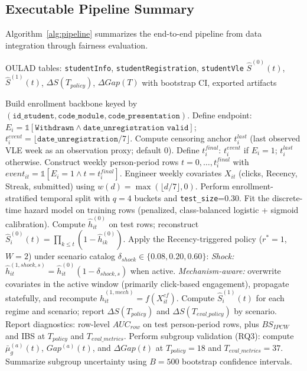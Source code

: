 \subsection{Executable Pipeline Summary}

Algorithm~\ref{alg:pipeline} summarizes the end-to-end pipeline from data integration through fairness evaluation.

\begin{algorithm}[!t]
\caption{Discrete-Time Survival + Counterfactual Policy Simulation}
\label{alg:pipeline}
\small
\begin{algorithmic}[1]
\Require OULAD tables: \texttt{studentInfo}, \texttt{studentRegistration}, \texttt{studentVle}
\Ensure $\hat S^{(0)}(t)$, $\hat S^{(1)}(t)$, $\Delta S(T_{policy})$, $\Delta Gap(T)$ with bootstrap CI, exported artifacts

\State Build enrollment backbone keyed by $(\texttt{id\_student},\texttt{code\_module},\texttt{code\_presentation})$.
\State Define endpoint: $E_i=\mathbb{1}[\texttt{Withdrawn} \wedge \texttt{date\_unregistration valid}]$; $t^{event}_i=\lfloor \texttt{date\_unregistration}/7 \rfloor$.
\State Compute censoring anchor $t^{last}_i$ (last observed VLE week as an observation proxy; default 0).
\State Define $t^{final}_i$: $t^{event}_i$ if $E_i=1$; $t^{last}_i$ otherwise.
\State Construct weekly person-period rows $t=0,\dots,t^{final}_i$ with $event_{it}=\mathbb{1}[E_i=1 \wedge t=t^{final}_i]$.
\State Engineer weekly covariates $X_{it}$ (clicks, Recency, Streak, submitted) using $w(d)=\max(\lfloor d/7\rfloor,0)$.
\State Perform enrollment-stratified temporal split with $q=4$ buckets and \texttt{test\_size}=0.30.
\State Fit the discrete-time hazard model on training rows (penalized, class-balanced logistic + sigmoid calibration).
\State Compute $\hat h^{(0)}_{it}$ on test rows; reconstruct $\hat S^{(0)}_i(t)=\prod_{k\le t}(1-\hat h^{(0)}_{ik})$.
\State Apply the Recency-triggered policy ($r^*=1$, $W=2$) under scenario catalog $\delta_{shock}\in\{0.08,0.20,0.60\}$:
\State \hspace{6pt} \textit{Shock:} $\hat h^{(1,shock,s)}_{it}=\hat h^{(0)}_{it}(1-\delta_{shock,s})$ when active.
\State \hspace{6pt} \textit{Mechanism-aware:} overwrite covariates in the active window (primarily click-based engagement), propagate statefully, and recompute $\hat h^{(1,mech)}_{it}=f(X^{cf}_{it})$.
\State Compute $\hat S^{(1)}_i(t)$ for each regime and scenario; report $\Delta S(T_{policy})$ and $\Delta S(T_{eval\_policy})$ by scenario.
\State Report diagnostics: row-level $AUC_{row}$ on test person-period rows, plus $BS_{IPCW}$ and IBS at $T_{policy}$ and $T_{eval\_metrics}$.
\State Perform subgroup validation (RQ3): compute $\bar\mu^{(a)}_g(t)$, $Gap^{(a)}(t)$, and $\Delta Gap(t)$ at $T_{policy}=18$ and $T_{eval\_metrics}=37$.
\State \hspace{6pt} Summarize subgroup uncertainty using $B=500$ bootstrap confidence intervals.
\end{algorithmic}
\end{algorithm}

